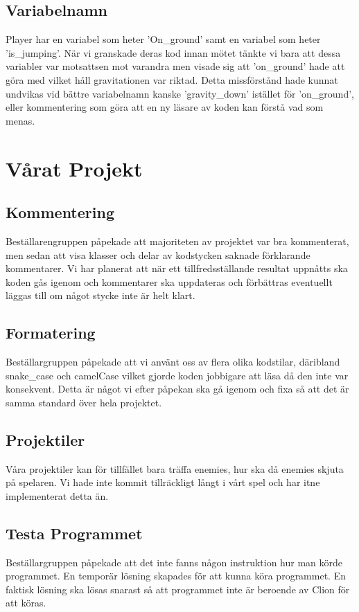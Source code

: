 \documentclass{TDP005mall}
\begin{document}
\subsection{Variabelnamn}
Player har en variabel som heter 'On\_ground' samt en variabel som heter 'is\_jumping'. När vi granskade deras kod innan mötet tänkte vi bara att dessa variabler var motsattsen mot varandra men visade sig att 'on\_ground' hade att göra med vilket håll gravitationen var riktad. Detta missförstånd hade kunnat undvikas vid bättre variabelnamn kanske 'gravity\_down' istället för 'on\_ground', eller kommentering som göra att en ny läsare av koden kan förstå vad som menas.




\section{Vårat Projekt}
\subsection{Kommentering}
Beställarengruppen påpekade att majoriteten av projektet var bra kommenterat, men sedan att visa klasser och delar av kodstycken saknade förklarande kommentarer.
Vi har planerat att när ett tillfredsställande resultat uppnåtts ska koden gås igenom och kommentarer ska uppdateras och förbättras eventuellt läggas till om något stycke inte är helt klart.

\subsection{Formatering}
Beställargruppen påpekade att vi använt oss av flera olika kodstilar,
däribland snake\_case och camelCase vilket gjorde koden jobbigare att läsa då den inte var konsekvent.
Detta är något vi efter påpekan ska gå igenom och fixa så att det är samma standard över hela projektet.

\subsection{Projektiler}
Våra projektiler kan för tillfället bara träffa enemies, hur ska då enemies skjuta på spelaren. Vi hade inte kommit tillräckligt långt i vårt spel och har itne implementerat detta än.

\subsection{Testa Programmet}
Beställargruppen påpekade att det inte fanns någon instruktion hur man körde programmet.
En temporär lösning skapades för att kunna köra programmet.
En faktisk lösning ska lösas snarast så att programmet inte är beroende av Clion för att köras.
\end{document}
